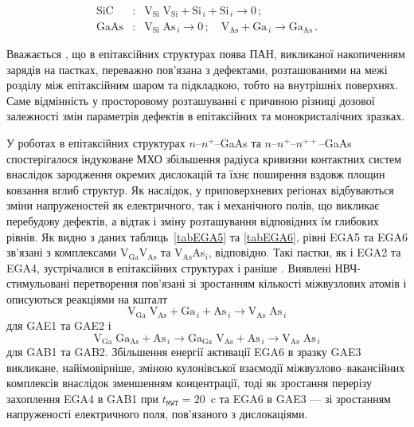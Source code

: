 \begin{eqnarray*}
  \text{SiC}&:&\text{V}_\text{Si}\;\text{V}_\text{Si}+\text{Si}_{\,i}+ \text{Si}_{\,i} \rightarrow 0\,;\\
  \text{GaAs}&:&\text{V}_\text{Si}\;\text{As}_{\,i} \rightarrow 0\,;\quad
  \text{V}_\text{As}+\text{Ga}_{\,i} \rightarrow \text{Ga}_\text{As}\,.
\end{eqnarray*}

Вважається \cite{Saiko1993,OlikhSSC,OstrovPAN}, що в епітаксійних структурах поява ПАН, викликаної накопиченням зарядів на пастках, переважно пов'язана з дефектами, розташованими на межі розділу між епітаксійним шаром та підкладкою,
тобто на внутрішніх поверхнях.
Саме відмінність у просторовому розташуванні є причиною різниці дозової залежності змін параметрів дефектів в епітаксійних та монокристалічних зразках.

У роботах \cite{Boltovets,Konakova2012FTP} в епітаксійних структурах $n$--$n^+$--GaAs та $n$--$n^+$--$n^{++}$--GaAs спостерігалося індуковане МХО збільшення радіуса кривизни контактних систем внаслідок зародження окремих дислокацій та їхнє поширення вздовж площин ковзання вглиб структур.
Як наслідок, у приповерхневих регіонах відбуваються зміни напруженостей як електричного, так і механічного полів,
що викликає перебудову дефектів, а відтак і зміну розташування відповідних їм глибоких рівнів.
Як видно з даних таблиць~\ref{tabEGA5} та \ref{tabEGA6}, рівні EGA5 та EGA6 зв'язані з комплексами V$_\text{Ga}$V$_\text{As}$ та V$_\text{As}$As$_i$, відповідно.
Такі пастки, як і EGA2 та EGA4, зустрічалися в епітаксійних структурах і раніше \cite{Yousefi1995,Mircea1975,Bourgoin:GaAs,ASHBY:GaAs,Fang:EL6,Lefevre1977,KolFTP1989r}.
Виявлені НВЧ-стимульовані перетворення пов'язані зі зростанням кількості міжвузлових атомів і описуються
реакціями на кшталт
\begin{equation*}
  \text{V}_\text{Ga}\;\text{V}_\text{As}+\text{Ga}_{\,i}+\text{As}_{\,i} \rightarrow \text{V}_\text{As}\;\text{As}_{\,i}
\end{equation*}
для GAE1 та GAE2 і
\begin{equation*}
  \text{V}_\text{Ga}\;\text{Ga}_\text{As}+\text{As}_{\,i} \rightarrow
  \text{Ga}_\text{Ga}\;\text{V}_\text{As}+\text{As}_{\,i} \rightarrow
  \text{V}_\text{As}\;\text{As}_{\,i}
\end{equation*}
для GAB1 та GAB2.
Збільшення енергії активації EGA6 в зразку GAE3 викликане, найімовірніше, зміною кулонівської взаємодії міжвузлово--вакансійних комплексів внаслідок зменшенням концентрації,
тоді як зростання перерізу захоплення EGA4 в GAB1 при $t_\mathtt{MWT}=20$~c та EGA6 в GAE3  --- зі зростанням напруженості електричного поля, пов'язаного з дислокаціями.


